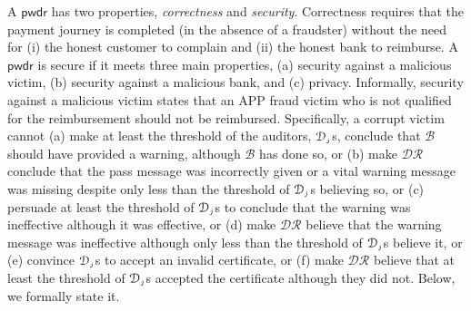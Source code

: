 
\vspace{-1.4mm}

A $\mathsf{pwdr}$  has two  properties,  \emph{correctness} and \emph{security}. Correctness requires that the payment journey is completed (in the absence of a fraudster) without the need for (i) the honest customer to complain and (ii)  the honest bank to reimburse.  A $\mathsf{pwdr}$  is secure if it meets three main properties,  (a) security against a malicious victim, (b) security against a malicious bank, and (c) privacy. 
%
%
 Informally, security against a malicious victim states that an APP fraud victim who is not qualified for the reimbursement should not be reimbursed. 
%
Specifically, a corrupt victim cannot (a) make at least the threshold of the  auditors, $\mathcal{D}_{\scriptscriptstyle j}$s,  conclude that $\mathcal{B}$ should have provided a warning, although $\mathcal{B}$ has done so, or (b) make $\mathcal{DR}$ conclude that   the pass message was incorrectly given or a vital warning message was missing despite only less than the threshold of  $\mathcal{D}_{\scriptscriptstyle j}$s  believing so, or (c) persuade at least the threshold of $\mathcal{D}_{\scriptscriptstyle j}$s to  conclude that the warning was ineffective although it was effective, or (d)  make $\mathcal{DR}$ believe that the warning message was ineffective although only less than the threshold of $\mathcal{D}_{\scriptscriptstyle j}$s believe it, or (e)  convince  $\mathcal{D}_{\scriptscriptstyle j}$s to accept an invalid certificate, or  (f) make $\mathcal{DR}$ believe that at least the threshold of $\mathcal{D}_{\scriptscriptstyle j}$s accepted the certificate  although they did not. Below, we formally state it. 
%
\vspace{-2.1mm}
